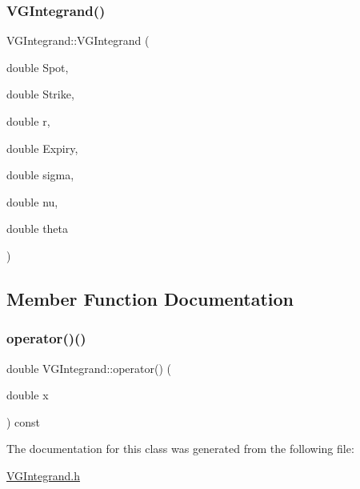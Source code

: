 \subsubsection{\texorpdfstring{V\+G\+Integrand()}{VGIntegrand()}}
{\footnotesize\ttfamily V\+G\+Integrand\+::\+V\+G\+Integrand (\begin{DoxyParamCaption}\item[{double}]{Spot,  }\item[{double}]{Strike,  }\item[{double}]{r,  }\item[{double}]{Expiry,  }\item[{double}]{sigma,  }\item[{double}]{nu,  }\item[{double}]{theta }\end{DoxyParamCaption})}



\subsection{Member Function Documentation}
\hypertarget{classVGIntegrand_afe06c29f37ea737a2460964799d268fc}{}\label{classVGIntegrand_afe06c29f37ea737a2460964799d268fc} 
\subsubsection{\texorpdfstring{operator()()}{operator()()}}
{\footnotesize\ttfamily double V\+G\+Integrand\+::operator() (\begin{DoxyParamCaption}\item[{double}]{x }\end{DoxyParamCaption}) const}



The documentation for this class was generated from the following file\+:\begin{DoxyCompactItemize}
\item 
\hyperlink{VGIntegrand_8h}{V\+G\+Integrand.\+h}\end{DoxyCompactItemize}
